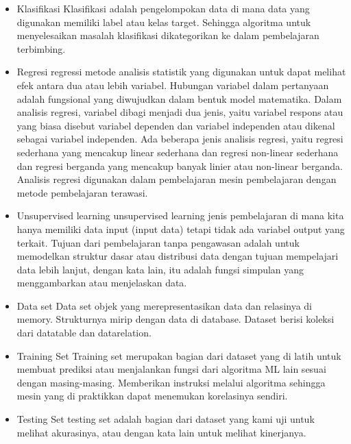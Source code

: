 \begin{enumerate}
\begin{itemize}
		\item Klasifikasi
		\hfill\break
		Klasifikasi adalah pengelompokan data di mana data yang digunakan memiliki label atau kelas target. Sehingga algoritma untuk menyelesaikan masalah klasifikasi dikategorikan ke dalam pembelajaran terbimbing.
		\item Regresi
		\hfill\break
		regressi metode analisis statistik yang digunakan untuk dapat melihat efek antara dua atau lebih variabel. Hubungan variabel dalam pertanyaan adalah fungsional yang diwujudkan dalam bentuk model matematika. Dalam analisis regresi, variabel dibagi menjadi dua jenis, yaitu variabel respons atau yang biasa disebut variabel dependen dan variabel independen atau dikenal sebagai variabel independen. Ada beberapa jenis analisis regresi, yaitu regresi sederhana yang mencakup linear sederhana dan regresi non-linear sederhana dan regresi berganda yang mencakup banyak linier atau non-linear berganda. Analisis regresi digunakan dalam pembelajaran mesin pembelajaran dengan metode pembelajaran terawasi.
		\item Unsupervised learning 
		\hfill\break
		unsupervised learning jenis pembelajaran di mana kita hanya memiliki data input (input data) tetapi tidak ada variabel output yang terkait. Tujuan dari pembelajaran tanpa pengawasan adalah untuk memodelkan struktur dasar atau distribusi data dengan tujuan mempelajari data lebih lanjut, dengan kata lain, itu adalah fungsi simpulan yang menggambarkan atau menjelaskan data.
		\item Data set
		\hfill\break
		Data set objek yang merepresentasikan data dan relasinya di memory. Strukturnya mirip dengan data di database. Dataset berisi koleksi dari datatable dan datarelation.
		\item Training Set
		\hfill\break
		Training set merupakan bagian dari dataset yang di latih untuk membuat prediksi atau menjalankan fungsi dari algoritma ML lain sesuai dengan masing-masing. Memberikan instruksi melalui algoritma sehingga mesin yang di praktikkan dapat menemukan korelasinya sendiri.
		\item Testing Set
		\hfill\break
		testing set adalah bagian dari dataset yang kami uji untuk melihat akurasinya, atau dengan kata lain untuk melihat kinerjanya.
	\end{itemize}
\end{enumerate}
